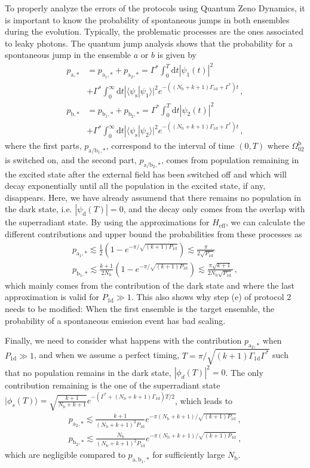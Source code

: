\documentclass[twocolumn,pra,aps,superscriptaddress,showpacs]{revtex4-1}
\newcommand{\ket}[1]{|#1\rangle}
\def\oned{\mathrm{1d}}
\newcommand{\rs}{\mathrm{s}}
\newcommand{\rd}{\mathrm{d}}
\renewcommand{\aa}{\mathrm{a}}
\newcommand{\bb}{\mathrm{b}}
\begin{document}
To properly analyze the errors of the protocols using Quantum Zeno Dynamics, it is important to know the probability of spontaneous jumps in both ensembles during the evolution.  Typically, the problematic processes are the ones associated to leaky photons. The quantum jump analysis shows that the probability for a spontaneous jump in the ensemble $a$ or $b$ is given by
%
\begin{align}
p_{\aa,*}&=p_{\aa_1,*}+p_{\aa_2,*}=\Gamma^*\int_0^{T} \rd t |\psi_1(t)|^2\\
	&+ \Gamma^*\int_{0}^\infty \rd t |\langle \psi_\rs | \psi_1 \rangle|^2 e^{-((N_\bb +k + 1) \Gamma_\oned +\Gamma^*) t}\,,  \nonumber \\
p_{\bb,*}&=p_{\bb_1,*}+p_{\bb_2,*}=\Gamma^*\int_0^{T} \rd t |\psi_2(t)|^2 \\
	&+ \Gamma^*\int_{0}^\infty \rd t  |\langle \psi_\rs | \psi_2 \rangle|^2 e^{-((N_\bb +k + 1) \Gamma_\oned +\Gamma^*) t}\,, \nonumber
\end{align}
%
where the first parts, $p_{\aa/\bb_1,*}$, correspond to the interval of time $(0,T)$ where $\Omega_{02}^\bb$ is switched on, and the second part, $p_{\aa/\bb_2,*}$, comes from population remaining in the excited state after the external field has been switched off and which will decay exponentially until all the population in the excited state, if any, disappears. Here, we have already assumend that there remains no population in the dark state, i.e. $|\psi_\rd(T)|=0$, and the decay only comes from the overlap with the superradiant state. By using the approximations for $H_\mathrm{eff}$, we can calculate the different contributions and upper bound the probabilities from these processes as
%
\begin{align}
p_{\aa_1,*}
	\lesssim \frac{1}{2}(1-e^{-\pi / \sqrt{(k+1) P_\oned}})
	\lesssim \frac{\pi}{2 \sqrt{P_\oned}}\,\\
p_{\bb_1,*}
	\lesssim \frac{k+1}{2 N_\bb}(1-e^{-\pi / \sqrt{(k+1) P_\oned}})
	\lesssim \frac{\pi \sqrt{k+1}}{2 N_\bb\sqrt{P_\oned}}\,,
\end{align}
%
which mainly comes from the contribution of the dark state and where the last approximation is valid for $P_\oned\gg 1$. This also shows why step (e) of protocol 2 needs to be modified: When the first ensemble is the target ensemble, the probability of a spontaneous emission event has bad scaling.

Finally, we need to consider what happens with the contribution $p_{\aa_2,*}$ when $P_\oned\gg 1$, and when we assume a perfect timing,  $T=\pi/\sqrt{(k+1) \Gamma_\oned \Gamma^*}$ such that no population remains in the dark state, $|\phi_d(T)|^2 = 0$. The only contribution remaining is the one of the superradiant state
$\ket{\phi_s(T)} = \sqrt{\frac{k+1}{N_\bb + k+1}} e^{-(\Gamma^*+(N_\bb + k + 1) \Gamma_{\oned})T/2}$, which leads to
%
\begin{align}
p_{\aa_2,*}\lesssim \frac{k+1}{(N_\bb + k+1)^2 P_\oned} e^{-\pi (N_\bb + k + 1) / \sqrt{(k+1)P_{\oned}}}\,, \\
p_{\bb_2,*}\lesssim \frac{N_\bb}{(N_\bb + k+1)^2 P_\oned} e^{-\pi (N_\bb + k + 1) / \sqrt{(k+1)P_{\oned}}} \,,
\end{align}
%
which are negligible compared to $p_{\aa,\bb_1,*}$ for sufficiently large $N_\bb$.
\end{document}
